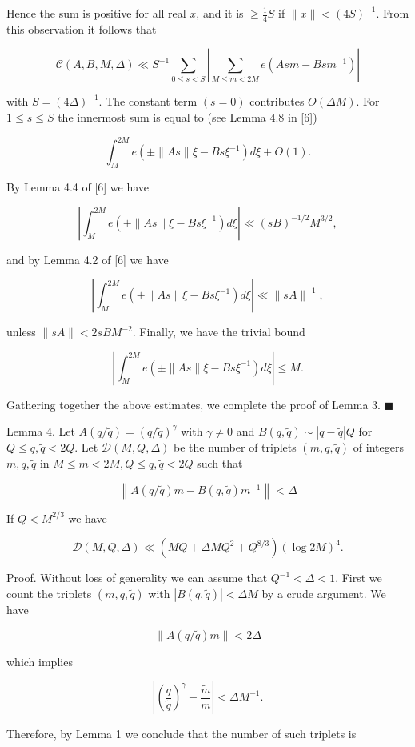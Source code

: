 \documentclass[10pt]{article}
\newcommand{\proofend}{\hfill\(\blacksquare\)}
\begin{document}
Hence the sum is positive for all real $x$, and it is $\geqslant\frac14S$
if $\|x\|<(4S)^{-1}$. From this observation it follows that

$$
\mathscr{C}(A,B,M,\Delta)\ll S^{-1}\sum_{0\leqslant s<S}
\left|\sum_{M\leqslant m<2M}e\left(Asm-Bsm^{-1}\right)\right|
$$

with $S=(4\Delta)^{-1}$. The constant term $(s=0)$ contributes
$O(\Delta M)$. For $1\leqslant s\leqslant S$ the innermost sum is equal to
(see Lemma 4.8 in [6])

$$
\int_M^{2M}e\left(\pm\|As\|\xi-Bs\xi^{-1}\right)d\xi+O(1).
$$

By Lemma 4.4 of [6] we have

$$
\left|\int_M^{2M}e\left(\pm\|As\|\xi-Bs\xi^{-1}\right)d\xi\right|
\ll (sB)^{-1/2}M^{3/2},
$$

and by Lemma 4.2 of [6] we have

$$
\left|\int_M^{2M}e\left(\pm\|As\|\xi-Bs\xi^{-1}\right)d\xi\right|
\ll \|sA\|^{-1},
$$

unless $\|sA\|<2sBM^{-2}$. Finally, we have the trivial bound

$$
\left|\int_M^{2M}e\left(\pm\|As\|\xi-Bs\xi^{-1}\right)d\xi\right|\leqslant M.
$$

Gathering together the above estimates, we complete the proof of Lemma 3.
\proofend

Lemma 4. Let $A(q / \tilde{q})=(q / \tilde{q})^{\gamma}$ with $\gamma \neq 0$ and $B(q, \tilde{q}) \sim|q-\tilde{q}| Q$ for $Q \leqslant q, \tilde{q}<2 Q$. Let $\mathscr{D}(M, Q, \Delta)$ be the number of triplets $(m, q, \tilde{q})$ of integers $m, q, \tilde{q}$ in $M \leqslant m<2 M, Q \leqslant q, \tilde{q}<2 Q$ such that

$$
\left\|A(q / \tilde{q}) m-B(q, \tilde{q}) m^{-1}\right\|<\Delta
$$

If $Q<M^{2 / 3}$ we have

$$
\mathscr{D}(M,Q,\Delta)\ll\left(M Q+\Delta M Q^{2}+Q^{8 / 3}\right)(\log 2 M)^{4} .
$$

Proof. Without loss of generality we can assume that $Q^{-1}<\Delta<1$. First we count the triplets $(m, q, \tilde{q})$ with $|B(q, \tilde{q})|<\Delta M$ by a crude argument. We have

$$
\|A(q/\tilde q)m\|<2\Delta
$$

which implies

$$
\left|\left(\frac{q}{\tilde{q}}\right)^{\gamma}-\frac{\tilde{m}}{m}\right|<\Delta M^{-1} .
$$

Therefore, by Lemma 1 we conclude that the number of such triplets is
\end{document}
